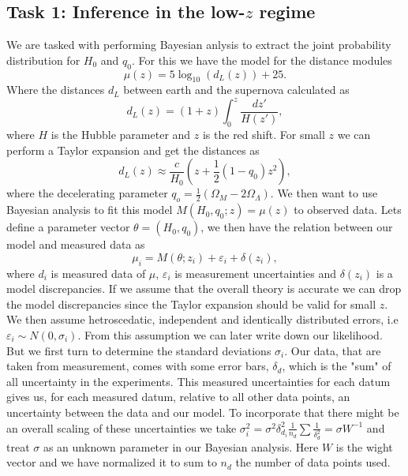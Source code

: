 \documentclass[11pt,a4paper]{article}
\begin{document}
\subsection[Task 1]{Task 1: Inference in the low-$z$ regime}
We are tasked with performing Bayesian anlysis to extract the joint probability distribution for $H_0$ and $q_0$. For this we have the model for the distance modules
\begin{equation*}
    \mu(z) = 5\log_{10}(d_L(z)) + 25.
\end{equation*}
Where the distances $d_L$ between earth and the supernova calculated as
\begin{equation*}
    d_L(z) = (1 + z )\int_0^z \frac{dz'}{H(z')},
\end{equation*}
where $H$ is the Hubble parameter and $z$ is the red shift. For small $z$ we can perform a Taylor expansion and get the distances as 
\begin{equation*}
    d_L(z) \approx \frac{c}{H_0} (z + \frac{1}{2}(1 - q_0)z^2),
\end{equation*}
where the decelerating parameter $q_o = \frac{1}{2}(\Omega_M - 2 \Omega_\Lambda)$. We then want to use Bayesian analysis to fit this model $M(H_0,q_0; z) = \mu(z)$ to observed data. Lets define a parameter vector $\theta = (H_0, q_0)$, we then have the relation between our model and measured data as
\begin{equation*}
    \mu_i = M(\theta; z_i) + \varepsilon_i + \delta(z_i),
\end{equation*}
where $d_i$ is measured data of $\mu$, $\varepsilon_i$ is measurement uncertainties and $\delta(z_i)$ is a model discrepancies. If we assume that the overall theory is accurate we can drop the model discrepancies since the Taylor expansion should be valid for small $z$. We then assume hetroscedatic, independent and identically distributed errors, i.e $\varepsilon_i \sim N(0, \sigma_i)$. From this assumption we can later write down our likelihood. But we first turn to determine the standard deviations $\sigma_i$. Our data, that are taken from measurement, comes with some error bars, $\delta_d$, which is the "sum" of all uncertainty in the experiments. This measured uncertainties for each datum gives us, for each measured datum,  relative to all other data points, an uncertainty between the data and our model. To incorporate that there might be an overall scaling of these uncertainties we take $\sigma_i^2 = \sigma^2 \delta_{d_i}^2 \frac{1}{n_d}\sum \frac{1}{\delta_d^2} = \sigma W^{-1}$ and treat $\sigma$ as an unknown parameter in our Bayesian analysis. Here $W$ is the wight vector and we have normalized it to sum to $n_d$ the number of data points used.
\end{document}
